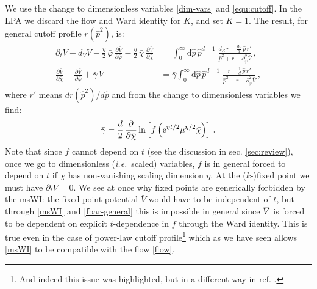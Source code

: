 \documentclass[11pt]{book} %
\newcommand{\overbar}[1]{\mkern 1.5mu\overline{\mkern-1.5mu#1\mkern-1.5mu}\mkern 1.5mu}
\newcommand{\bV}{\overbar V}
\newcommand\ie{\textit{i.e.}\ }
\newcommand{\bc}{\bar \chi}
\numberwithin{equation}{chapter}
\begin{document}
We use the change to dimensionless variables \eqref{dim-vars} and \eqref{equ:cutoff}.
In the LPA we discard the flow and Ward identity for $K$, and set $\bar K=1$.
The result, for general cutoff profile $r(\hat{p}^2)$, is:
\begin{align}
  \label{flow}
  \partial_t \bar V + d_V \bar V - \frac{\eta}{2} \, \bar\varphi \, \frac{\partial \bar V}{\partial \bar\varphi} - \frac{\eta}{2} \, \bar\chi \, \frac{\partial \bar V}{\partial \bar\chi} &=
  \int_0^{\infty} \mathrm d\hat p \, \hat p^{d-1} \; \frac{d_R\, r - \frac{d_V}{d} \, \hat p \, r'}{\hat p^2 + r - \partial^2_{\bar\varphi}\bar V}\,,\\
  \label{msWI}
  \frac{\partial \bar V}{\partial \bar\chi} - \frac{\partial \bar V}{\partial \bar\varphi} + \bar \gamma \, \bar V &= \bar \gamma
  \int_0^{\infty} \mathrm d\hat p \, \hat p^{d-1} \; \frac{r - \frac{1}{d} \, \hat p \, r'}{\hat p^2 + r - \partial^2_{\bar\varphi}\bar V} \,,
\end{align}
where $r'$ means $dr(\hat{p}^2)/d\hat{p}$ and from the change to dimensionless variables we find:
\begin{align}
  \label{fbar-general}
  \bar{\gamma} = \frac{d}{2} \, \frac{\partial}{\partial\bc}\ln
  \left[
    \bar{f}\left({\rm e}^{\eta t/2}\mu^{\eta/2}\bc\right)
  \right]\,.
\end{align}
Note that since $f$ cannot depend on $t$ (see the discussion in sec. \ref{sec:review}),
once we go to dimensionless (\ie scaled) variables, $\bar{f}$ is in general forced to depend on
$t$ if $\chi$ has non-vanishing scaling dimension $\eta$.
At the ($k$-)fixed point we must have $\partial_t \bar V = 0$. We see at once why fixed points are
generically forbidden by the msWI: the fixed point potential $\bar{V}$ would have to be independent of $t$,
but through \eqref{msWI} and \eqref{fbar-general} this is impossible in general since $\bV$ is forced
to be dependent on explicit $t$-dependence in $\bar{f}$ through the Ward identity.
This is true even in the case of power-law cutoff profile\footnote{And indeed this issue was highlighted,
but in a different way in ref. \cite{Dietz:2015owa}.} which as we have seen allows \eqref{msWI} to be
compatible with the flow \eqref{flow}.
\end{document}
